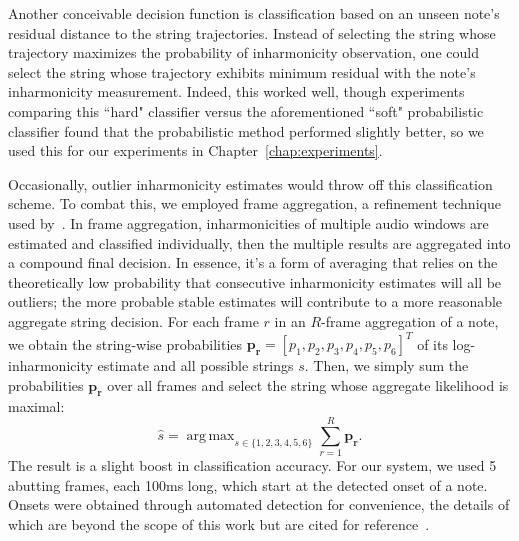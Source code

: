 \documentclass[12pt]{cmuthesis}
\DeclareMathOperator*{\argmax}{arg\,max}
\begin{document}
Another conceivable decision function is classification based on an unseen note's residual distance to the string trajectories. Instead of selecting the string whose trajectory maximizes the probability of inharmonicity observation, one could select the string whose trajectory exhibits minimum residual with the note's inharmonicity measurement. Indeed, this worked well, though experiments comparing this ``hard" classifier versus the aforementioned ``soft" probabilistic classifier found that the probabilistic method performed slightly better, so we used this for our experiments in Chapter~\ref{chap:experiments}.

Occasionally, outlier inharmonicity estimates would throw off this classification scheme. To combat this, we employed frame aggregation, a refinement technique used by~\cite{abesser2012}. In frame aggregation, inharmonicities of multiple audio windows are estimated and classified individually, then the multiple results are aggregated into a compound final decision. In essence, it's a form of averaging that relies on the theoretically low probability that consecutive inharmonicity estimates will all be outliers; the more probable stable estimates will contribute to a more reasonable aggregate string decision. For each frame $r$ in an $R$-frame aggregation of a note, we obtain the string-wise probabilities $\mathbf{p_r} = [p_1,p_2,p_3,p_4,p_5,p_6]^T$ of its log-inharmonicity estimate and all possible strings $s$. Then, we simply sum the probabilities $\mathbf{p_r}$ over all frames and select the string whose aggregate likelihood is maximal:
\begin{equation}
\hat{s} = \argmax_{s\in\{1,2,3,4,5,6\}}\sum_{r=1}^{R} \mathbf{p_r}.
\end{equation}
The result is a slight boost in classification accuracy. For our system, we used 5 abutting frames, each 100ms long, which start at the detected onset of a note. Onsets were obtained through automated detection for convenience, the details of which are beyond the scope of this work but are cited for reference~\cite{bello2005,dixon2006}.
\end{document}
